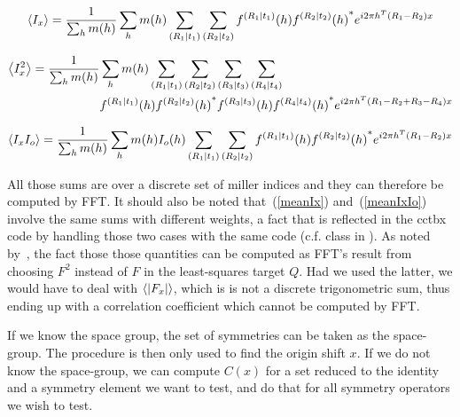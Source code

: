 \documentclass[11pt]{article}
\begin{document}
\begin{equation}
\left\langle I_x \right\rangle = \frac{1}{\sum_h m(h)}\sum_h m(h) \sum_{\left( R_1 \mid t_1 \right)} \sum_{\left( R_2 \mid t_2 \right)} f^{\left( R_1 \mid t_1 \right)}(h) {f^{\left( R_2 \mid t_2 \right)}(h)}^* e^{i2\pi h^T (R_1 - R_2)x} 
\label{meanIx}
\end{equation}

\begin{equation}
\begin{split}
\left\langle I_x^2 \right\rangle = \frac{1}{\sum_h m(h)}&\sum_h m(h) \sum_{\left( R_1 \mid t_1 \right)} \sum_{\left( R_2 \mid t_2 \right)} \sum_{\left( R_3 \mid t_3 \right)} \sum_{\left( R_4 \mid t_4 \right)} \\
&f^{\left( R_1 \mid t_1 \right)}(h) {f^{\left( R_2 \mid t_2 \right)}(h)}^* f^{\left( R_3 \mid t_3 \right)}(h) {f^{\left( R_4 \mid t_4 \right)}(h)}^* e^{i2\pi h^T (R_1 - R_2 + R_3 - R_4)x}
\end{split}
\label{meanIxsq}
\end{equation}

\begin{equation}
\left\langle I_x I_o \right\rangle = \frac{1}{\sum_h m(h)}\sum_h m(h)  I_o(h) \sum_{\left( R_1 \mid t_1 \right)} \sum_{\left( R_2 \mid t_2 \right)} f^{\left( R_1 \mid t_1 \right)}(h) {f^{\left( R_2 \mid t_2 \right)}(h)}^* e^{i2\pi h^T (R_1 - R_2)x}
\label{meanIxIo}
\end{equation}

All those sums are over a discrete set of miller indices and they can therefore be computed by FFT. It should also be noted that~(\ref{meanIx}) and~(\ref{meanIxIo}) involve the same sums with different weights, a fact that is reflected in the cctbx code by handling those two cases with the same code (c.f. class  in ). As noted by~\cite{J.Navaza:1995}, the fact those those quantities can be computed as FFT's result from choosing $F^2$ instead of $F$ in the least-squares target $Q$. Had we used the latter, we would have to deal with $\left\langle |F_x| \right\rangle$, which is is not a discrete trigonometric sum, thus ending up with a correlation coefficient which cannot be computed by FFT.

If we know the space group, the set of symmetries can be taken as the space-group. The procedure is then only used to find the origin shift $x$. If we do not know the space-group, we can compute $C(x)$ for a set reduced to the identity and a symmetry element we want to test, and do that for all symmetry operators we wish to test.


\end{document}
